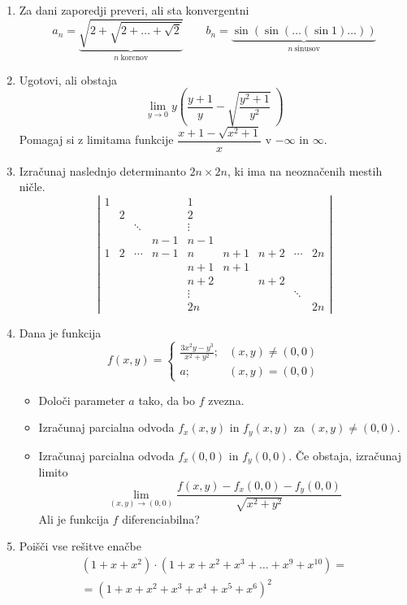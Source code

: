 \documentclass[a4paper,12pt]{article}
\begin{document}
\begin{enumerate}
\item
Za dani zaporedji preveri, ali sta konvergentni
$$
   a_n = \underbrace{\sqrt{2+\sqrt{2+\dots+\sqrt{2}}}}_{n~\text{korenov}} \qquad
   b_n = \underbrace{\sin(\sin(\dots(\sin 1)\dots))}_{n~\text{sinusov}}
$$

\item
Ugotovi, ali obstaja
$$ \lim_{y\to 0} y\left(\frac{y+1}{y}-\sqrt{\frac{y^2+1}{y^2}}\;\right) $$
Pomagaj si z limitama funkcije $\dfrac{x+1-\sqrt{x^2+1}}{x}$ v $-\infty$ in $\infty$.

\item
Izračunaj naslednjo determinanto $2n \times 2n$, ki ima na neoznačenih mestih ničle.
$$
   \left|
      \begin{array}{ccccccccc}
         1 &&&& 1 &&&& \\
         & 2 &&& 2 &&&& \\
         && \ddots && \vdots &&&& \\
         &&& n-1 & n-1 &&&& \\
         1 & 2 & \cdots & n-1 & n & n+1 & n+2 & \cdots & 2n \\
         &&&& n+1 & n+1 &&& \\
         &&&& n+2 && n+2 && \\
         &&&& \vdots &&& \ddots & \\
         &&&& 2n &&&& 2n
      \end{array}
   \right|
$$

\item
Dana je funkcija
$$
   f(x,y) = \begin{cases}
      \frac{3x^2y-y^3}{x^2+y^2}; & (x,y)\ne(0,0) \\
      a; & (x,y)=(0,0)
   \end{cases}
$$
\begin{itemize}
   \item Določi parameter $a$ tako, da bo $f$ zvezna.
   \item Izračunaj parcialna odvoda $f_x(x,y)$ in $f_y(x,y)$ za $(x,y)\ne(0,0)$.
   \item Izračunaj parcialna odvoda $f_x(0,0)$ in $f_y(0,0)$.
         Če obstaja, izračunaj limito
         $$ \lim_{(x,y)\to(0,0)} \frac{f(x,y)-f_x(0,0)-f_y(0,0)}{\sqrt{x^2+y^2}} $$
         Ali je funkcija $f$ diferenciabilna?
\end{itemize}

\item
Poišči vse rešitve enačbe
\begin{multline*}
   (1+x+x^2) \cdot (1+x+x^2+x^3+\ldots+x^9+x^{10}) = \\
   =(1+x+x^2+x^3+x^4+x^5+x^6)^2
\end{multline*}


\end{enumerate}
\end{document}

